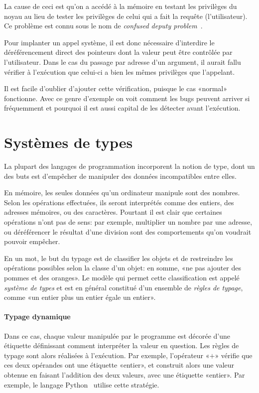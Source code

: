 La cause de ceci est qu'on a accédé à la mémoire en testant les privilèges du
noyau au lieu de tester les privilèges de celui qui a fait la requête
(l'utilisateur). Ce problème est connu sous le nom de \emph{confused deputy
problem}~\cite{hardy88confused}.

Pour implanter un appel système, il est donc nécessaire d'interdire le
déréférencement direct des pointeurs dont la valeur peut être contrôlée par
l'utilisateur. Dans le cas du passage par adresse d'un argument, il aurait fallu
vérifier à l'exécution que celui-ci a bien les mêmes privilèges que l'appelant.

Il est facile d'oublier d'ajouter cette vérification, puisque le cas «normal»
fonctionne. Avec ce genre d'exemple on voit comment les bugs peuvent arriver si
fréquemment et pourquoi il est aussi capital de les détecter avant l'exécution.

\section{Systèmes de types}
\label{sec:types-intro}

La plupart des langages de programmation incorporent la notion de type, dont un
des buts est d'empêcher de manipuler des données incompatibles entre elles.

En mémoire, les seules données qu'un ordinateur manipule sont des nombres. Selon
les opérations effectuées, ils seront interprétés comme des entiers, des
adresses mémoires, ou des caractères. Pourtant il est clair que certaines
opérations n'ont pas de sens: par exemple, multiplier un nombre par une adresse,
ou déréférencer le résultat d'une division sont des comportements qu'on voudrait
pouvoir empêcher.

En un mot, le but du typage est de classifier les objets et de restreindre les
opérations possibles selon la classe d'un objet: en somme, «ne pas ajouter des
pommes et des oranges». Le modèle qui permet cette classification est appelé
\emph{système de types} et est en général constitué d'un ensemble de
\emph{règles de typage}, comme «un entier plus un entier égale un entier».

\paragraph{Typage dynamique}

Dans ce cas, chaque valeur manipulée par le programme est décorée d'une
étiquette définissant comment interpréter la valeur en question. Les règles de
typage sont alors réalisées à l'exécution. Par exemple, l'opérateur «$+$»
vérifie que ces deux opérandes ont une étiquette «entier», et construit alors
une valeur obtenue en faisant l'addition des deux valeurs, avec une étiquette
«entier». Par exemple, le langage Python~ utilise cette
stratégie.

